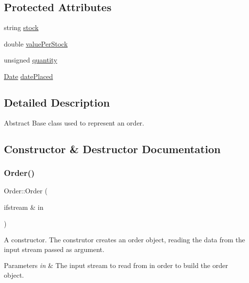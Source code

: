 \subsection*{Protected Attributes}
\begin{DoxyCompactItemize}
\item 
string \hyperlink{class_order_aafb6dfab2a1c253eefd78840b27dcd2e}{stock}
\item 
double \hyperlink{class_order_ab5d512fb35483413b9fe200d58324c2e}{value\+Per\+Stock}
\item 
unsigned \hyperlink{class_order_ab02e2baeb8c57217a20c9124df3ba11d}{quantity}
\item 
\hyperlink{class_date}{Date} \hyperlink{class_order_a23f58bb3f0162aac8c91a8a14136990c}{date\+Placed}
\end{DoxyCompactItemize}


\subsection{Detailed Description}
Abstract Base class used to represent an order. 

\subsection{Constructor \& Destructor Documentation}
\mbox{\label{class_order_afd9bc0f1cf5ad376154ffde0e2727fbb}} 
\subsubsection{\texorpdfstring{Order()}{Order()}\hspace{0.1cm}{\footnotesize\ttfamily [1/2]}}
{\footnotesize\ttfamily Order\+::\+Order (\begin{DoxyParamCaption}\item[{ifstream \&}]{in }\end{DoxyParamCaption})}

A constructor. The construtor creates an order object, reading the data from the input stream passed as argument. 
\begin{DoxyParams}{Parameters}
{\em in} & The input stream to read from in order to build the order object. \\
\hline
\end{DoxyParams}
\mbox{\label{class_order_afdda61d21957bffaf29e666ee6741bdc}} 
